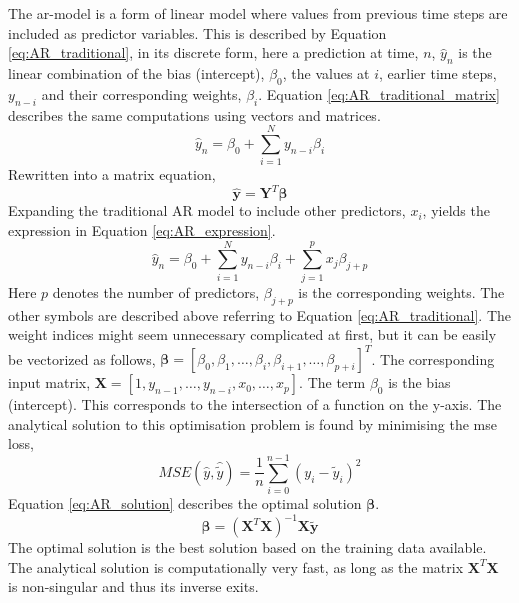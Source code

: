The \acrshort{ar}-model is a form of linear model where values from previous time steps are included as predictor variables. This is described by Equation \eqref{eq:AR_traditional}, in its discrete form, here a prediction at time, $n$, $\hat{y}_n$ is the linear combination of the bias (intercept), $\beta_0$, the values at $i$, earlier time steps, $y_{n-i}$ and their corresponding weights, $\beta_i$. Equation \eqref{eq:AR_traditional_matrix} describes the same computations using vectors and matrices.
\begin{equation} \label{eq:AR_traditional}
    \hat{y}_n = \beta_0 + \sum_{i = 1}^{N} y_{n-i} \beta_{i}
\end{equation}
Rewritten into a matrix equation, 
\begin{equation} \label{eq:AR_traditional_matrix}
    \hat{\mathbf{y}} = \mathbf{Y}^T \mathbf{\beta}
\end{equation}
Expanding the traditional AR model to include other predictors, $x_i$, yields the expression in Equation \eqref{eq:AR_expression}.
\begin{equation} \label{eq:AR_expression}
    \hat{y}_n = \beta_0 + \sum_{i = 1}^{N} y_{n-i}\beta_{i}+ \sum_{j=1}^p x_j\beta_{j+p}
\end{equation}
Here $p$ denotes the number of predictors, $\beta_{j+p}$ is the corresponding weights. The other symbols are described above referring to Equation \eqref{eq:AR_traditional}. 
The weight indices might seem unnecessary complicated at first, but it can be easily be vectorized as follows, $\mathbf{\beta} = [\beta_0, \beta_1, \ldots, \beta_i, \beta_{i+1}, \ldots, \beta_{p+i}]^T$. The corresponding input matrix, $\mathbf{X} = [1, y_{n-1}, \ldots, y_{n-i}, x_0, \ldots, x_p]$. The term $\beta_0$ is the bias (intercept). This corresponds to the intersection of a function on the y-axis. The analytical solution to this optimisation problem is found by minimising the \acrfull{mse} loss, 
\begin{equation} \label{eq:mse}
    MSE(\hat{y},\hat{\tilde{y}}) = \frac{1}{n} \sum_{i=0}^{n-1}(y_i-\tilde{y}_i)^2
\end{equation} 
Equation \eqref{eq:AR_solution} describes the optimal solution $\mathbf{\beta}$. 
\begin{equation} \label{eq:AR_solution}
    \mathbf{\beta}  = \left( \mathbf{X}^T\mathbf{X}\right)^{-1} \mathbf{X}\tilde{\mathbf{y}}
\end{equation}
The optimal solution is the best solution based on the training data available. The analytical solution is computationally very fast, as long as the matrix $\mathbf{X}^T\mathbf{X}$ is non-singular and thus its inverse exits.



